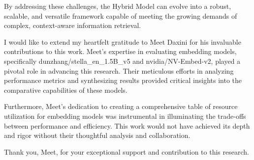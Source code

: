 \documentclass[pdflatex,sn-mathphys-num]{sn-jnl}%
\begin{document}
By addressing these challenges, the Hybrid Model can evolve into a robust, scalable, and versatile framework capable of meeting the growing demands of complex, context-aware information retrieval.



I would like to extend my heartfelt gratitude to Meet Daxini for his invaluable contributions to this work. Meet's expertise in evaluating embedding models, specifically dunzhang/stella\_en\_1.5B\_v5 and nvidia/NV-Embed-v2, played a pivotal role in advancing this research. Their meticulous efforts in analyzing performance metrics and synthesizing results provided critical insights into the comparative capabilities of these models.

Furthermore, Meet's dedication to creating a comprehensive table of resource utilization for embedding models was instrumental in illuminating the trade-offs between performance and efficiency. This work would not have achieved its depth and rigor without their thoughtful analysis and collaboration.

Thank you, Meet, for your exceptional support and contribution to this research.
\end{document}

